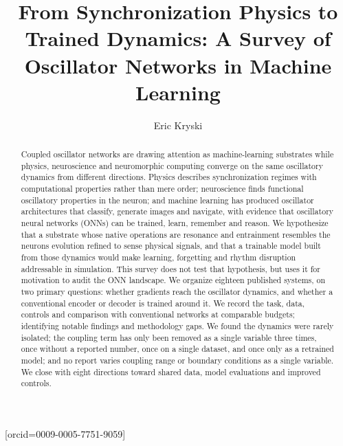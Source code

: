 \documentclass[a4paper,fleqn]{cas-sc}
\begin{document}
\let\WriteBookmarks\relax
\def\floatpagepagefraction{1}
\def\textpagefraction{.001}

\title[mode=title]{From Synchronization Physics to Trained Dynamics: A
Survey of Oscillator Networks in Machine Learning}

\author[1]{Eric Kryski}[orcid=0009-0005-7751-9059]
\cormark[1]

\begin{abstract}
Coupled oscillator networks are drawing attention as machine-learning
substrates while physics, neuroscience and neuromorphic computing
converge on the same oscillatory dynamics from different directions.
Physics describes synchronization regimes with computational properties
rather than mere order; neuroscience finds functional oscillatory
properties in the neuron; and machine learning has produced oscillator
architectures that classify, generate images and navigate, with evidence
that oscillatory neural networks (ONNs) can be trained, learn, remember
and reason. We hypothesize that a substrate whose native operations are
resonance and entrainment resembles the neurons evolution refined to
sense physical signals, and that a trainable model built from those
dynamics would make learning, forgetting and rhythm disruption
addressable in simulation. This survey does not test that hypothesis,
but uses it for motivation to audit the ONN landscape. We organize
eighteen published systems, on two primary questions: whether gradients
reach the oscillator dynamics, and whether a conventional encoder or
decoder is trained around it. We record the task, data, controls and
comparison with conventional networks at comparable budgets; identifying
notable findings and methodology gaps. We found the dynamics were rarely
isolated; the coupling term has only been removed as a single variable
three times, once without a reported number, once on a single dataset,
and once only as a retrained model; and no report varies coupling range
or boundary conditions as a single variable. We close with eight
directions toward shared data, model evaluations and improved controls.
\end{abstract}
\end{document}
